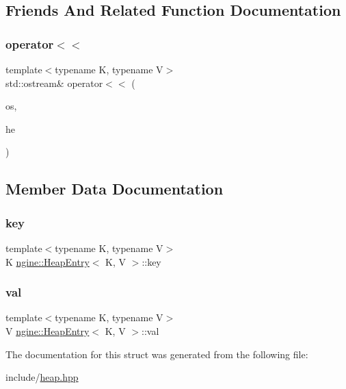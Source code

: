 \subsection{Friends And Related Function Documentation}
\mbox{\label{structngine_1_1HeapEntry_aea75fb367eeb7649e249c9a78b54d9be}} 
\subsubsection{\texorpdfstring{operator$<$$<$}{operator<<}}
{\footnotesize\ttfamily template$<$typename K, typename V$>$ \\
std\+::ostream\& operator$<$$<$ (\begin{DoxyParamCaption}\item[{std\+::ostream \&}]{os,  }\item[{\hyperlink{structngine_1_1HeapEntry}{Heap\+Entry}$<$ K, V $>$ \&}]{he }\end{DoxyParamCaption})\hspace{0.3cm}{\ttfamily [friend]}}



\subsection{Member Data Documentation}
\mbox{\label{structngine_1_1HeapEntry_abfd2e1cf093aced3d57a7892127c3d88}} 
\subsubsection{\texorpdfstring{key}{key}}
{\footnotesize\ttfamily template$<$typename K, typename V$>$ \\
K \hyperlink{structngine_1_1HeapEntry}{ngine\+::\+Heap\+Entry}$<$ K, V $>$\+::key}

\mbox{\label{structngine_1_1HeapEntry_a4b3d62cb43639d79fa71ed6e01ca6975}} 
\subsubsection{\texorpdfstring{val}{val}}
{\footnotesize\ttfamily template$<$typename K, typename V$>$ \\
V \hyperlink{structngine_1_1HeapEntry}{ngine\+::\+Heap\+Entry}$<$ K, V $>$\+::val}



The documentation for this struct was generated from the following file\+:\begin{DoxyCompactItemize}
\item 
include/\hyperlink{heap_8hpp}{heap.\+hpp}\end{DoxyCompactItemize}
